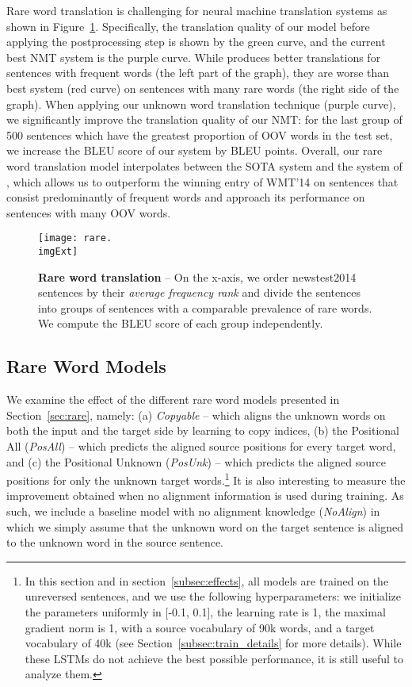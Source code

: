 \documentclass[11pt]{article}
\begin{document}
Rare word translation is challenging for neural machine translation systems as
shown in Figure~\ref{f:rare}. Specifically, the translation quality of our
model before applying the postprocessing step is shown by the green curve, and the current
best NMT system \cite{sutskever14} is the purple curve. While \cite{sutskever14}
produces better translations for sentences with frequent words (the left part of the
graph), they are worse than best system (red curve)
on sentences with many rare words (the right side of the graph). When applying our
unknown word translation technique (purple curve), we
significantly improve the translation quality of our NMT: 
for the last group of 500 sentences which have the greatest proportion of 
OOV words in the test set, we increase the BLEU score of our system by 
\imprare{} BLEU points. Overall, our rare word translation model 
interpolates between the SOTA system and the system
of ,  which allows us to outperform the winning entry of WMT'14
on sentences that consist predominantly of frequent words and approach its performance on sentences
with many OOV words.
\begin{figure}
\centering
\texttt{[image: rare.\\imgExt]} \caption{{\bf Rare word translation} -- 
On the x-axis, we order newstest2014 sentences by their {\it average frequency rank} and divide the sentences into groups 
of sentences with a comparable prevalence of rare words. 
We compute the BLEU score of each group independently.} 
\label{f:rare}
\end{figure}


\subsection{Rare Word Models}
\label{subsec:rare_model_compare}

We examine the effect of the different rare word models presented in
Section~\ref{sec:rare}, namely: (a) {\it Copyable} -- which aligns the unknown
words on both the input and the target side by learning to copy indices, (b) the Positional All
({\it PosAll}) -- which predicts the aligned source positions for every target
word, and (c) the Positional Unknown ({\it PosUnk}) -- which predicts the aligned
source positions for only the unknown target words.\footnote{In this section and in section~\ref{subsec:effects},
all models are trained on the unreversed sentences, and we use the following hyperparameters: 
we initialize the parameters uniformly in [-0.1, 0.1], the learning rate is 1, the maximal gradient norm is 1, 
with a source vocabulary of 90k words, and a target vocabulary of 40k (see Section~\ref{subsec:train_details} for more details).
While these LSTMs do not achieve the best possible performance, it is still useful to analyze them.}
It is also interesting to measure the improvement obtained when no alignment information is used during training.
As such, we include a baseline model with no alignment knowledge ({\it NoAlign}) in which we simply assume that the  unknown word on the target
sentence is aligned to the  unknown word in the source sentence.
\end{document}
